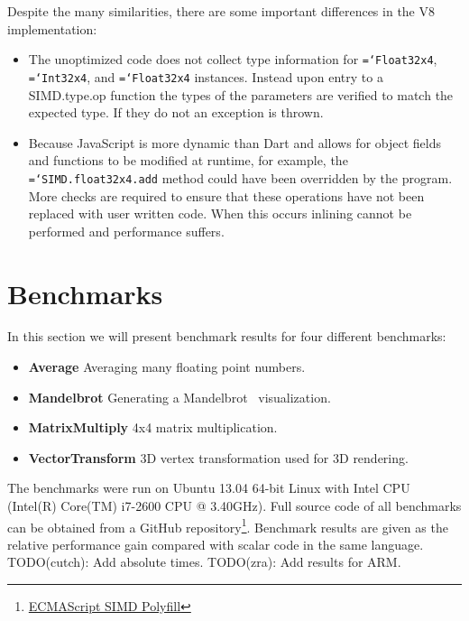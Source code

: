 \documentclass[preprint]{sigplanconf}
\newcommand{\ttt}[1]{{\texttt{\hyphenchar\font=`\-\relax #1}}}%
\newcommand{\fixme}[1]{{\color{red} #1}}
\begin{document}
Despite the many similarities, there are some important differences in the V8
implementation:

\begin{itemize}
\item
The unoptimized code does not collect type information for \ttt{Float32x4},
\ttt{Int32x4}, and \ttt{Float32x4} instances. Instead upon entry to a
SIMD.type.op function the types of the parameters are verified to match the
expected type. If they do not an exception is thrown.

\item
Because JavaScript is more dynamic than Dart and allows for object fields and
functions to be modified at runtime, for example, the \ttt{SIMD.float32x4.add}
method could have been overridden by the program. More checks are required to
ensure that these operations have not been replaced with user written code. When
this occurs inlining cannot be performed and performance suffers.

\end{itemize}

\section{Benchmarks}

In this section we will present benchmark results for four different benchmarks:

\begin{itemize}

\item
\textbf{Average} Averaging many floating point numbers.

\item
\textbf{Mandelbrot} Generating a Mandelbrot~\cite{mandelbrot} visualization.

\item
\textbf{MatrixMultiply} 4x4 matrix multiplication.

\item
\textbf{VectorTransform} 3D vertex transformation used for 3D rendering.
\end{itemize}

The benchmarks were run on Ubuntu 13.04 64-bit Linux with Intel CPU (Intel(R)
Core(TM) i7-2600 CPU @ 3.40GHz). Full source code of all benchmarks can be
obtained from a GitHub repository\footnote{\href{https://github.com/johnmccut
chan/ecmascript_simd/}{ECMAScript SIMD Polyfill}}. Benchmark results are given
as the relative performance gain compared with scalar code in the same language.
\fixme{TODO(cutch): Add absolute times.} \fixme{TODO(zra): Add results for ARM.}
\end{document}
